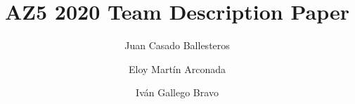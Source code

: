 %

\documentclass[runningheads,a4paper]{llncs}
\usepackage{amssymb}
\setcounter{tocdepth}{3}
\usepackage{graphicx}
\usepackage{amssymb}
\usepackage{enumitem}
\usepackage[utf8]{inputenc}
\usepackage[hidelinks]{hyperref}
\usepackage{url}
\usepackage{float}
\usepackage{amsmath}
\usepackage{graphicx}
\usepackage{wrapfig}
\usepackage{fancyhdr}
\usepackage{titling}
\usepackage{xcolor}
\usepackage{lipsum}



%
\title{AZ5 2020 Team Description Paper}

\author{
  Juan Casado Ballesteros
  \and Eloy Martín Arconada
  \and Iván Gallego Bravo
}



\maketitle

